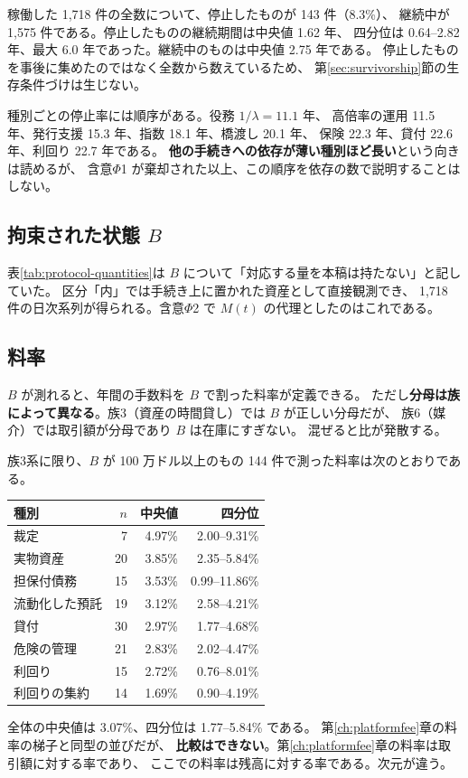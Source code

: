 稼働した 1,718 件の全数について、停止したものが 143 件（8.3\%）、
継続中が 1,575 件である。停止したものの継続期間は中央値 1.62 年、
四分位は 0.64--2.82 年、最大 6.0 年であった。継続中のものは中央値 2.75 年である。
停止したものを事後に集めたのではなく全数から数えているため、
第\ref{sec:survivorship}節の生存条件づけは生じない。

種別ごとの停止率には順序がある。役務 $1/\lambda=11.1$ 年、
高倍率の運用 11.5 年、発行支援 15.3 年、指数 18.1 年、橋渡し 20.1 年、
保険 22.3 年、貸付 22.6 年、利回り 22.7 年である。
\textbf{他の手続きへの依存が薄い種別ほど長い}という向きは読めるが、
含意$\Phi$1 が棄却された以上、この順序を依存の数で説明することはしない。

\subsection{拘束された状態 $B$}
表\ref{tab:protocol-quantities}は $B$ について「対応する量を本稿は持たない」と記していた。
区分「内」では手続き上に置かれた資産として直接観測でき、
1,718 件の日次系列が得られる。含意$\Phi$2 で $M(t)$ の代理としたのはこれである。

\subsection{料率}
$B$ が測れると、年間の手数料を $B$ で割った料率が定義できる。
ただし\textbf{分母は族によって異なる}。族3（資産の時間貸し）では $B$ が正しい分母だが、
族6（媒介）では取引額が分母であり $B$ は在庫にすぎない。
混ぜると比が発散する。

族3系に限り、$B$ が 100 万ドル以上のもの 144 件で測った料率は次のとおりである。

\begin{center}
\begin{tabularx}{\textwidth}{@{}Xrrr@{}}
\toprule
種別 & $n$ & 中央値 & 四分位 \\
\midrule
裁定 & 7 & 4.97\% & 2.00--9.31\% \\
実物資産 & 20 & 3.85\% & 2.35--5.84\% \\
担保付債務 & 15 & 3.53\% & 0.99--11.86\% \\
流動化した預託 & 19 & 3.12\% & 2.58--4.21\% \\
貸付 & 30 & 2.97\% & 1.77--4.68\% \\
危険の管理 & 21 & 2.83\% & 2.02--4.47\% \\
利回り & 15 & 2.72\% & 0.76--8.01\% \\
利回りの集約 & 14 & 1.69\% & 0.90--4.19\% \\
\bottomrule
\end{tabularx}
\label{tab:protocol-fee-ladder}
\end{center}

全体の中央値は 3.07\%、四分位は 1.77--5.84\% である。
第\ref{ch:platformfee}章の料率の梯子と同型の並びだが、
\textbf{比較はできない}。第\ref{ch:platformfee}章の料率は取引額に対する率であり、
ここでの料率は残高に対する率である。次元が違う。

